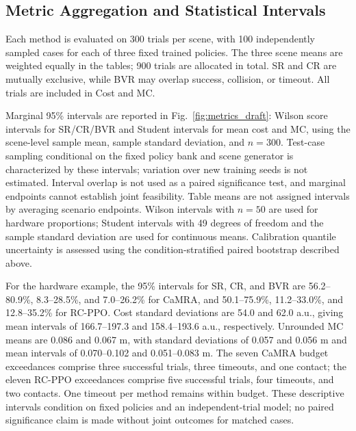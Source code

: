 \documentclass[conference]{IEEEtran}
\begin{document}
\subsection{Metric Aggregation and Statistical Intervals}
Each method is evaluated on 300 trials per scene, with 100 independently
sampled cases for each of three fixed trained policies. The three scene means
are weighted equally in the tables; 900 trials are allocated in total.
SR and CR are mutually exclusive, while BVR may overlap success, collision,
or timeout. All trials are included in Cost and MC.

Marginal 95\% intervals are reported in Fig.~\ref{fig:metrics_draft}: Wilson
score intervals for SR/CR/BVR and Student intervals for mean cost and MC,
using the scene-level sample mean, sample standard deviation, and $n=300$.
Test-case sampling conditional on the fixed policy bank and scene generator is
characterized by these intervals; variation over new training seeds is not estimated.
Interval overlap is not used as a paired significance test, and marginal
endpoints cannot establish joint feasibility. Table means are not assigned
intervals by averaging scenario endpoints. Wilson intervals with $n=50$ are used
for hardware proportions; Student intervals with 49 degrees of freedom and the
sample standard deviation are used for continuous means. Calibration quantile
uncertainty is assessed using the condition-stratified paired bootstrap described above.

For the hardware example, the 95\% intervals for SR, CR, and BVR are
56.2--80.9\%, 8.3--28.5\%, and 7.0--26.2\% for CaMRA, and
50.1--75.9\%, 11.2--33.0\%, and 12.8--35.2\% for RC-PPO.
Cost standard deviations are 54.0 and 62.0 a.u., giving mean intervals of
166.7--197.3 and 158.4--193.6 a.u., respectively. Unrounded MC means are
0.086 and 0.067 m, with standard deviations of 0.057 and 0.056 m and mean
intervals of 0.070--0.102 and 0.051--0.083 m.
The seven CaMRA budget exceedances comprise three successful trials, three
timeouts, and one contact; the eleven RC-PPO exceedances comprise five successful
trials, four timeouts, and two contacts. One timeout per method remains within
budget. These descriptive intervals condition on fixed policies and an
independent-trial model; no paired significance claim is made without joint
outcomes for matched cases.
\end{document}
